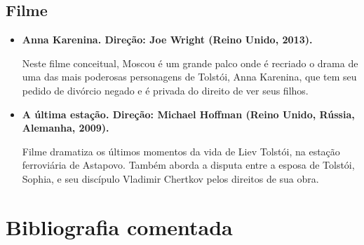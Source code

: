 \documentclass[12pt]{extarticle}
\begin{document}
\subsection{Filme}

\begin{itemize}
\item\textbf{Anna Karenina. Direção: Joe Wright (Reino Unido, 2013).}

Neste filme conceitual, Moscou é um grande palco onde é recriado o drama
de uma das mais poderosas personagens de Tolstói, Anna Karenina, que tem
seu pedido de divórcio negado e é privada do direito de ver seus filhos.

\item\textbf{A última estação. Direção: Michael Hoffman (Reino Unido, Rússia,
Alemanha, 2009).}

Filme dramatiza os últimos momentos da vida de Liev Tolstói, na estação
ferroviária de Astapovo. Também aborda a disputa entre a esposa de
Tolstói, Sophia, e seu discípulo Vladimir Chertkov pelos direitos de sua
obra.
\end{itemize}

\section{Bibliografia comentada}
\end{document}
